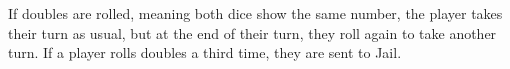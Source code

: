 If doubles are rolled, meaning both dice show the same number, the player takes their turn as usual, but at the end of their turn, they roll again to take another turn. If a player rolls doubles a third time, they are sent to Jail.